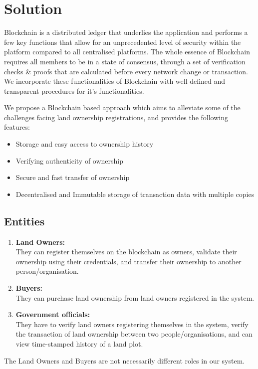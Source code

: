 \documentclass[conference]{IEEEtran}
\begin{document}
\section{Solution}
Blockchain is a distributed ledger that underlies the application and performs a few key functions that allow for an unprecedented level of security within the platform compared to all centralised platforms. The whole essence of Blockchain requires all members to be in a state of consensus, through a set of verification checks \& proofs that are calculated before every network change or transaction. We incorporate these functionalities of Blockchain with well defined and transparent procedures for it's functionalities.

We propose a Blockchain based approach which aims to alleviate some of the challenges facing land ownership registrations, and provides the following features:
\begin{itemize}
    \item Storage and easy access to ownership history
    \item Verifying authenticity of ownership
    \item Secure and fast transfer of ownership
    \item Decentralised and Immutable storage of transaction data with multiple copies
\end{itemize}

\subsection{Entities}
\begin{enumerate}
    \item \textbf{Land Owners:}\\They can register themselves on the blockchain as owners, validate their ownership using their credentials, and transfer their ownership to another person/organisation.
    \item \textbf{Buyers:}\\They can purchase land ownership from land owners registered in the system.
    \item \textbf{Government officials:}\\They have to verify land owners registering themselves in the system, verify the transaction of land ownership between two people/organisations, and can view time-stamped history of a land plot.
\end{enumerate}
The Land Owners and Buyers are not necessarily different roles in our system.
\end{document}
